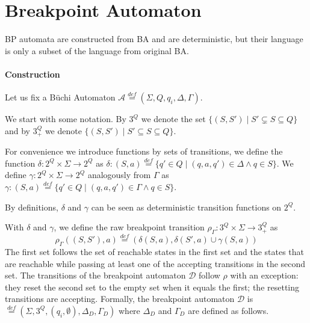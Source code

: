 \documentclass[
	digital
nolof, nolot
]{fithesis3}
\newcommand{\cA}{\mathcal{A}}
\newcommand{\cD}{\mathcal{D}}
\newcommand{\lA}{L(\cA)}
\newcommand{\lD}{L(\cD)}
\newcommand{\eqdef}{\overset{def}{=}}
\begin{document}
			\section{Breakpoint Automaton} \label{section:bp}
			
			 BP automata are constructed from BA and are deterministic, but their language is only a subset of the language from original BA. 
			
			\paragraph{Construction}
			Let us fix a Büchi Automaton $\cA\eqdef(\Sigma, Q, q_i, \Delta, \Gamma)$. 
			
			We start with some notation. By $3^Q$ we denote the set $\{(S,S') \mid S'\subsetneq S \subseteq Q\}$ and
			by $3^Q_+$ we denote $\{(S,S') \mid S'\subseteq S \subseteq Q\}$.
			
			
			For convenience we introduce functions by sets of transitions, we define the function $\delta \colon 2^Q \times \Sigma \rightarrow 2^Q$ as 	
			$\delta\colon (S,a)\eqdef\{q'\in Q \mid  (q,a,q') \in \Delta \land q \in S\}$.
			We define $\gamma:2^Q  \times \Sigma \rightarrow 2^Q$ analogously from $\Gamma$ as $\gamma\colon (S,a)\eqdef\{q'\in Q \mid  (q,a,q') \in \Gamma \land q \in S\}$.
			
			By definitions, $\delta$ and $\gamma$ can be seen as deterministic transition functions on $2^Q$.
			
			With $\delta$ and $\gamma$, we define the raw breakpoint transition
			$\rho_\Gamma \colon 3^Q \times \Sigma \rightarrow 3^Q_+$ as
			\[\rho_\Gamma((S, S'), a) \eqdef(\delta(S, a), \delta(S',a)\cup \gamma(S, a))\]
			The first set follows the set of reachable states in the first set and the states that are reachable while passing at least one of the accepting transitions in the second set.
			The transitions of the breakpoint automaton $\cD$ follow $\rho$ with an exception: they reset the second set to the empty set when it equals the first; the resetting transitions are accepting.
			Formally, the breakpoint automaton $\cD$ is $ \eqdef (\Sigma, 3^Q, (q_i, \emptyset), \Delta_D, \Gamma_D)$ where $\Delta_D$ and $\Gamma_D$ are defined as follows. 
			
\end{document}
